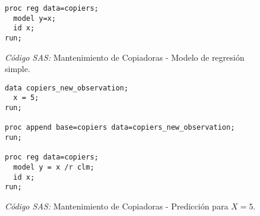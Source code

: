 \documentclass{article}
\begin{document}
    \begin{figure}[!h]
      \centering
      \begin{verbatim}
proc reg data=copiers;
  model y=x;
  id x;
run;
      \end{verbatim}
      \caption{\emph{Código SAS:} Mantenimiento de Copiadoras - Modelo de regresión simple.}
      \label{code:sas-copiers-2}
    \end{figure}

    \begin{figure}[!h]
      \centering
      \begin{verbatim}
data copiers_new_observation;
  x = 5;
run;

proc append base=copiers data=copiers_new_observation;
run;

proc reg data=copiers;
  model y = x /r clm;
  id x;
run;
      \end{verbatim}
      \caption{\emph{Código SAS:} Mantenimiento de Copiadoras - Predicción para $X = 5$.}
      \label{code:sas-copiers-2}
    \end{figure}

  \nocite{rano2017}
  \nocite{sas}
  \nocite{neter1996applied}
  \nocite{montgomery2012introduction}

  
  
\end{document}
